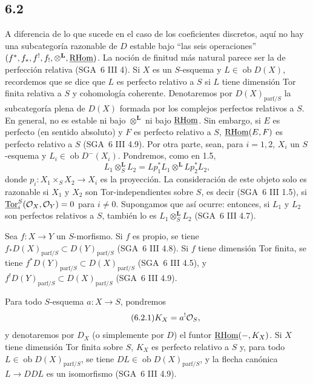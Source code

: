 \subsection*{6.2}
A diferencia de lo que sucede en el caso de los coeficientes discretos, aquí no hay una subcategoría razonable de $D$ estable bajo ``las seis operaciones'' $(f^*,f_*,f^!,f_!,\otimes^{\mathbf L},\underline{\mathrm{RHom}})$. La noción de finitud más natural parece ser la de perfección relativa (SGA~6 III 4). Si $X$ es un $S$-esquema y $L\in\operatorname{ob}D(X)$, recordemos que se dice que $L$ es perfecto relativo a $S$ si $L$ tiene dimensión Tor finita relativa a $S$ y cohomología coherente. Denotaremos por $D(X)_{\mathrm{parf}/S}$ la subcategoría plena de $D(X)$ formada por los complejos perfectos relativos a $S$. En general, no es estable ni bajo $\otimes^{\mathbf L}$ ni bajo $\underline{\mathrm{RHom}}$. Sin embargo, si $E$ es perfecto (en sentido absoluto) y $F$ es perfecto relativo a $S$, $\underline{\mathrm{RHom}}(E,F)$ es perfecto relativo a $S$ (SGA~6 III 4.9). Por otra parte, sean, para $i=1,2$, $X_i$ un $S$-esquema y $L_i\in\operatorname{ob}D^{-}(X_i)$. Pondremos, como en 1.5,
\[
L_1\otimes_S^{\mathbf L}L_2=Lp_1^*L_1\otimes^{\mathbf L}Lp_2^*L_2,
\]
donde $p_i:X_1\times_SX_2\to X_i$ es la proyección. La consideración de este objeto solo es razonable si $X_1$ y $X_2$ son Tor-independientes sobre $S$, es decir (SGA~6 III 1.5), si $\underline{\operatorname{Tor}}_i^S(\mathcal{O}_X,\mathcal{O}_Y)=0$ para $i\ne0$. Supongamos que así ocurre: entonces, si $L_1$ y $L_2$ son perfectos relativos a $S$, también lo es $L_1\otimes_S^{\mathbf L}L_2$ (SGA~6 III 4.7).

Sea $f:X\to Y$ un $S$-morfismo. Si $f$ es propio, se tiene $f_*D(X)_{\mathrm{parf}/S}\subset D(Y)_{\mathrm{parf}/S}$ (SGA~6 III 4.8). Si $f$ tiene dimensión Tor finita, se tiene $f^*D(Y)_{\mathrm{parf}/S}\subset D(X)_{\mathrm{parf}/S}$ (SGA~6 III 4.5), y $f^!D(Y)_{\mathrm{parf}/S}\subset D(X)_{\mathrm{parf}/S}$ (SGA~6 III 4.9).

Para todo $S$-esquema $a:X\to S$, pondremos
\begin{equation}
\tag{6.2.1}
K_X=a^!\mathcal{O}_S,
\end{equation}
y denotaremos por $D_X$ (o simplemente por $D$) el funtor $\underline{\mathrm{RHom}}(-,K_X)$. Si $X$ tiene dimensión Tor finita sobre $S$, $K_X$ es perfecto relativo a $S$ y, para todo $L\in\operatorname{ob}D(X)_{\mathrm{parf}/S}$, se tiene $DL\in\operatorname{ob}D(X)_{\mathrm{parf}/S}$, y la flecha canónica $L\to DDL$ es un isomorfismo (SGA~6 III 4.9).

